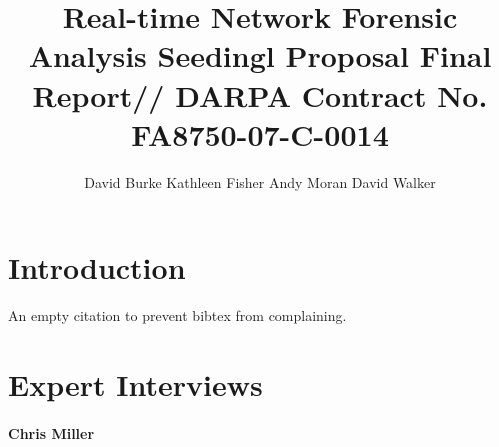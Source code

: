 \documentclass{article}
\title{Real-time Network Forensic Analysis Seedingl Proposal Final Report//
DARPA Contract No. FA8750-07-C-0014}
\author{
David Burke \qquad
Kathleen Fisher \qquad
Andy Moran \qquad
David Walker
}
\begin{document}
\maketitle{}

\section{Introduction}
\label{sec:intro}

An empty citation to prevent bibtex from complaining.~\cite{fisher+:pads}

\section{Expert Interviews}
\label{sec:interviews}

\paragraph*{Chris Miller}
\end{document}
